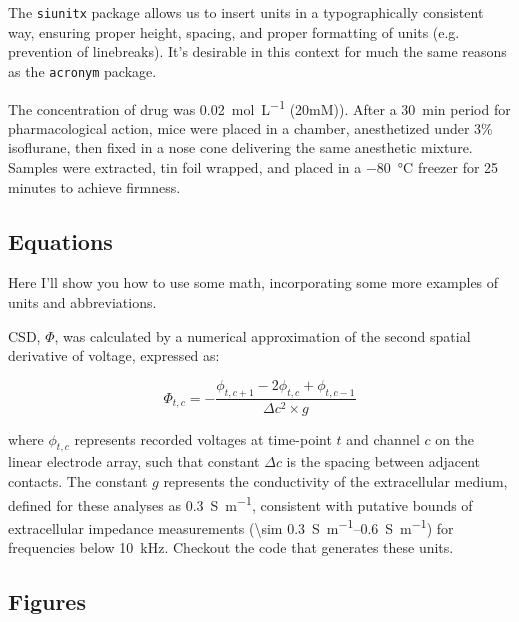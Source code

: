 \documentclass[../../main.tex]{subfiles}  %
\begin{document}
	The \verb|siunitx| package allows us to insert units in a typographically consistent way, ensuring proper height, spacing, and proper formatting of units (e.g. prevention of linebreaks).
	It's desirable in this context for much the same reasons as the \verb|acronym| package.

	The concentration of drug was \SI[per-mode=fraction]{0.02}{\mol\per\L} (20mM)).
	After a \SI{30}{\minute} period for pharmacological action, mice were placed in a chamber, anesthetized under 3\% isoflurane, then fixed in a nose cone delivering the same anesthetic mixture. 
	Samples were extracted, tin foil wrapped, and placed in a \SI{-80}{\degreeCelsius} freezer for 25 minutes to achieve firmness. 

	\subsection{Equations}

	Here I'll show you how to use some math, incorporating some more examples of units and abbreviations.

	\Acf{CSD}, $\Phi$, was calculated by a numerical approximation of the second spatial derivative of voltage, expressed as:

	\begin{equation}
		\Phi_{t, c} = -\frac{\phi_{t, c+1} - 2\phi_{t, c} + \phi_{t, c-1}}{\Delta c^2 \times g}
	\end{equation}

	where $\phi_{t, c}$ represents recorded voltages at time-point $t$ and channel $c$ on the linear electrode array, such that constant $\Delta c$ is the spacing between adjacent contacts. 
	The constant $g$ represents the conductivity of the extracellular medium, defined for these analyses as \SI[per-mode=fraction]{0.3}{\siemens\per\m}, consistent with putative bounds of extracellular impedance measurements (\qtyrange[range-units=single,range-phrase=-]{\sim 0.3}{0.6}{\siemens\per\m}) for frequencies below \SI{10}{\kHz}. 
	Checkout the code that generates these units. 

	\subsection{Figures}
\end{document}
